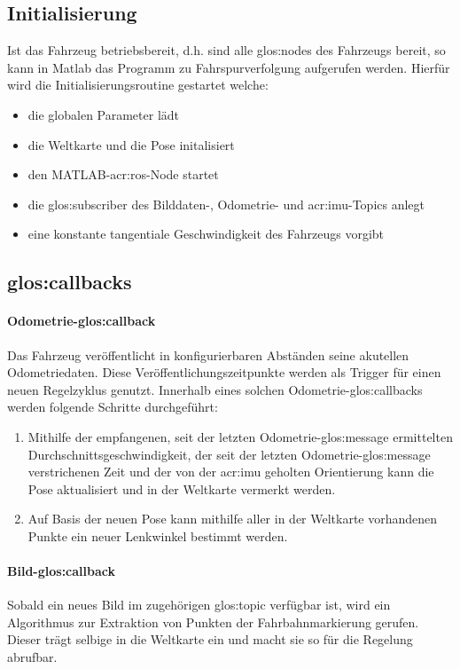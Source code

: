 \subsection{Initialisierung}
Ist das Fahrzeug betriebsbereit, d.h. sind alle \glspl{glos:node} des Fahrzeugs bereit, so kann in Matlab das Programm zu Fahrspurverfolgung aufgerufen werden. Hierfür wird die Initialisierungsroutine gestartet welche:
\begin{itemize}
\item die globalen Parameter lädt
\item die Weltkarte und die Pose initalisiert
\item den MATLAB-\gls{acr:ros}-Node startet
\item die \gls{glos:subscriber} des Bilddaten-, Odometrie- und \gls{acr:imu}-Topics anlegt
\item eine konstante tangentiale Geschwindigkeit des Fahrzeugs vorgibt 
\end{itemize}

\subsection{\glspl{glos:callback}}
\paragraph{Odometrie-\gls{glos:callback}}
Das Fahrzeug veröffentlicht in konfigurierbaren Abständen seine akutellen Odometriedaten. Diese Veröffentlichungszeitpunkte werden als Trigger für einen neuen Regelzyklus genutzt. Innerhalb eines solchen Odometrie-\gls{glos:callback}s werden folgende Schritte durchgeführt:
\begin{enumerate}
\item Mithilfe der empfangenen, seit der letzten Odometrie-\gls{glos:message} ermittelten Durchschnittsgeschwindigkeit, der seit der letzten Odometrie-\gls{glos:message} verstrichenen Zeit und der von der \gls{acr:imu} geholten Orientierung kann die Pose aktualisiert und in der Weltkarte vermerkt werden.
\item Auf Basis der neuen Pose kann mithilfe aller in der Weltkarte vorhandenen Punkte ein neuer Lenkwinkel bestimmt werden.
\end{enumerate}
\paragraph{Bild-\gls{glos:callback}}
Sobald ein neues Bild im zugehörigen \gls{glos:topic} verfügbar ist, wird ein  Algorithmus zur Extraktion von Punkten der Fahrbahnmarkierung gerufen. Dieser trägt selbige in die Weltkarte ein und macht sie so für die Regelung abrufbar.
